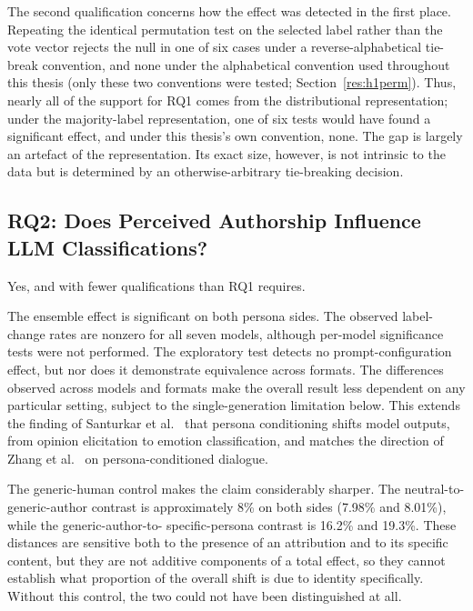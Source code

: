 The second qualification concerns how the effect was detected in the first place.
Repeating the identical permutation test on the selected label rather than the vote vector rejects
the null in one of six cases under a reverse-alphabetical tie-break convention, and none under the
alphabetical convention used throughout this thesis (only these two conventions were tested;
Section~\ref{res:h1perm}). Thus, nearly all of the support for RQ1 comes from the distributional
representation; under the majority-label representation, one of six tests would have found a
significant effect, and under this thesis's own convention, none. The gap is largely an artefact
of the representation. Its exact size, however, is not intrinsic to the data but is determined by
an otherwise-arbitrary tie-breaking decision.

\subsection{RQ2: Does Perceived Authorship Influence LLM Classifications?}
\label{disc:rq2}

\noindent
Yes, and with fewer qualifications than RQ1 requires.

The ensemble effect is significant on both persona sides. The observed label-change rates are
nonzero for all seven models, although per-model significance tests were not performed. The
exploratory test detects no prompt-configuration effect, but nor does it demonstrate equivalence
across formats. The differences observed across models and formats make the overall
result less dependent on any particular setting, subject to the single-generation limitation
below. This extends the finding of Santurkar et al.\ \citeyear{Santurkar2023WhoseOpinions} that
persona conditioning shifts model outputs, from opinion elicitation to emotion classification, and
matches the direction of Zhang et al.\ \citeyear{Zhang2018Persona} on persona-conditioned dialogue.

The generic-human control makes the claim considerably sharper. The neutral-to-generic-author
contrast is approximately 8\% on both sides (7.98\% and 8.01\%), while the generic-author-to-
specific-persona contrast is 16.2\% and 19.3\%. These distances are sensitive both to the presence
of an attribution and to its specific content, but they are not additive components of a total
effect, so they cannot establish what proportion of the overall shift is due to identity
specifically. Without this control, the two could not have been distinguished at all.

